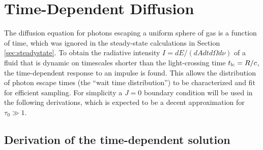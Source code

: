 \documentclass{aastex63}
\begin{document}
\section{Time-Dependent Diffusion}
\label{sec:time_dependent}

The diffusion equation for photons escaping a uniform sphere of gas is a function of time, which was ignored in the steady-state calculations in Section \ref{sec:steadystate}. To obtain the radiative intensity $I=dE/(dAdtd\Omega d\nu)$ of a fluid that is dynamic on timescales shorter than the light-crossing time $t_{\rm lc} = R/c$, the time-dependent response to an impulse is found. This allows the distribution of photon escape times (the ``wait time distribution'') to be characterized and fit for efficient sampling. For simplicity a $J=0$ boundary condition will be used in the following derivations, which is expected to be a decent approximation for $\tau_0 \gg 1$. 

\subsection{Derivation of the time-dependent solution}
\label{subsec:time_dependent:background}
\end{document}
